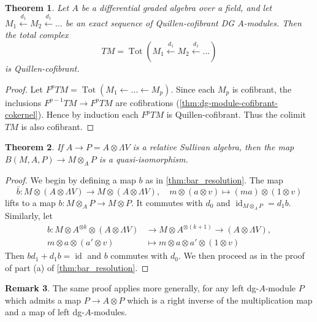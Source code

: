 \documentclass{scrartcl}
\theoremstyle{plain}
\newtheorem{theorem}{Theorem}[section]
\theoremstyle{definition}
\newtheorem{remark}[theorem]{Remark}
\DeclareMathOperator{\Tot}{Tot}
\newcommand{\from}{\leftarrow}
\let\xfrom\xleftarrow
\DeclareMathOperator{\id}{id}
\begin{document}
\begin{theorem}\label{thm:cofibrant-resolution-dga-mod}
    Let $A$ be a differential graded algebra over a field, and let $M_1\xfrom{d_1} M_2\xfrom{d_1}\dots$ be an exact sequence of Quillen-cofibrant DG $A$-modules. Then the total complex $$TM=\Tot(M_1\xfrom{d_1} M_2\xfrom{d_1} \dots)$$ is Quillen-cofibrant.
\end{theorem}

\begin{proof}
    Let $F^pTM = \Tot(M_1\from\dots\from M_p)$. Since each $M_p$ is cofibrant, the inclusions $F^{p-1}TM \to F^pTM$ are cofibrations (\ref{thm:dg-module-cofibrant-cokernel}). Hence by induction each $F^pTM$ is Quillen-cofibrant. Thus the colimit $TM$ is also cofibrant. 
\end{proof}

\begin{theorem}\label{thm:bar-resolution-sullivan}
    If $A\to P = A\otimes \Lambda V$ is a relative Sullivan algebra, then the map $B(M, A, P) \to M\otimes_A P$ is a quasi-isomorphism.
\end{theorem}
\begin{proof}
    We begin by defining a map $b$ as in \ref{thm:bar_resolution}. The map $$\bar b \colon M\otimes (A\otimes \Lambda V) \to M\otimes (A\otimes \Lambda V),\quad m\otimes (a\otimes v)\mapsto (ma)\otimes (1\otimes v)$$ lifts to a map $b\colon M\otimes_A P\to M\otimes P$. It commutes with $d_0$ and $\id_{M\otimes_A P} = d_1 b$. Similarly, let 
    \begin{align*}
        b\colon M\otimes A^{\otimes k} \otimes (A\otimes \Lambda V)&\to M\otimes A^{\otimes (k+1)} \to (A\otimes \Lambda V), \\
        m\otimes a \otimes (a'\otimes v) &\mapsto m\otimes a \otimes a' \otimes (1\otimes v)
    \end{align*}
    Then $b d_1 + d_1 b = \id$ and $b$ commutes with $d_0$. We then proceed as in the proof of part (a) of \ref{thm:bar_resolution}. 
\end{proof}
\begin{remark}
    The same proof applies more generally, for any left dg-$A$-module $P$ which admits a map $P\to A\otimes P$ which is a right inverse of the multiplication map and a map of left dg-$A$-modules.
\end{remark}
\end{document}
